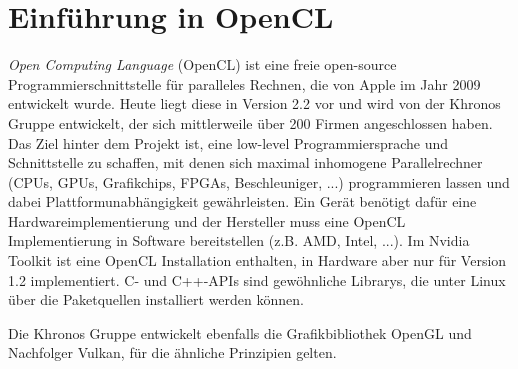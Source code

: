 	\chapter{Einf\"uhrung in OpenCL}
	\textit{Open Computing Language} (OpenCL) ist eine freie open-source Programmierschnittstelle für paralleles Rechnen, die von Apple im Jahr 2009 entwickelt wurde. Heute liegt diese in Version 2.2 vor und wird von der Khronos Gruppe entwickelt, der sich mittlerweile über 200 Firmen angeschlossen haben. Das Ziel hinter dem Projekt ist, eine low-level Programmiersprache und Schnittstelle zu schaffen, mit denen sich maximal inhomogene Parallelrechner (CPUs, GPUs, Grafikchips, FPGAs, Beschleuniger, ...) programmieren lassen und dabei Plattformunabhängigkeit gewährleisten. Ein Gerät benötigt dafür eine Hardwareimplementierung und der Hersteller muss eine OpenCL Implementierung in Software bereitstellen (z.B. AMD, Intel, ...). Im Nvidia Toolkit ist eine OpenCL Installation enthalten, in Hardware aber nur für Version 1.2 implementiert. C- und C++-\Glspl{API} sind gewöhnliche Librarys, die unter Linux über die Paketquellen installiert werden können.
	
	Die Khronos Gruppe entwickelt ebenfalls die Grafikbibliothek OpenGL und Nachfolger Vulkan, für die ähnliche Prinzipien gelten. 
	 
